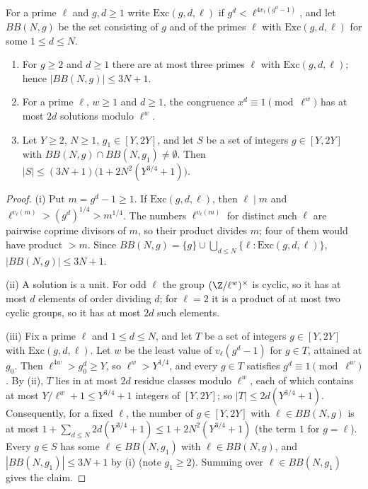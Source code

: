 \begin{lemma}\label{pf:top-supply:choicecount}
For a prime $\ell$ and $g,d\ge1$ write $\mathrm{Exc}(g,d,\ell)$ if $g^d<\ell^{4v_\ell(g^d-1)}$, and let $BB(N,g)$ be the set
consisting of $g$ and of the primes $\ell$ with $\mathrm{Exc}(g,d,\ell)$ for some $1\le d\le N$.
\begin{enumerate}[label=(\roman*)]
\item For $g\ge2$ and $d\ge1$ there are at most three primes $\ell$ with $\mathrm{Exc}(g,d,\ell)$; hence $|BB(N,g)|\le3N+1$.
\item For a prime $\ell$, $w\ge1$ and $d\ge1$, the congruence $x^d\equiv1\pmod{\ell^w}$ has at most $2d$ solutions modulo
$\ell^w$.
\item Let $Y\ge2$, $N\ge1$, $g_1\in[Y,2Y]$, and let $S$ be a set of integers $g\in[Y,2Y]$ with
$BB(N,g)\cap BB(N,g_1)\ne\emptyset$. Then $|S|\le(3N+1)\big(1+2N^2(Y^{3/4}+1)\big)$.
\end{enumerate}
 
 
 
 
\end{lemma}

\begin{proof}
(i) Put $m=g^d-1\ge1$. If $\mathrm{Exc}(g,d,\ell)$, then $\ell\mid m$ and $\ell^{v_\ell(m)}>(g^d)^{1/4}>m^{1/4}$. The numbers
$\ell^{v_\ell(m)}$ for distinct such $\ell$ are pairwise coprime divisors of $m$, so their product divides $m$; four of them
would have product $>m$. Since $BB(N,g)=\{g\}\cup\bigcup_{d\le N}\{\ell:\mathrm{Exc}(g,d,\ell)\}$, $|BB(N,g)|\le3N+1$.

(ii) A solution is a unit. For odd $\ell$ the group $(\Z/\ell^w)^\times$ is cyclic, so it has at most $d$ elements of order
dividing $d$; for $\ell=2$ it is a product of at most two cyclic groups, so it has at most $2d$ such elements.

(iii) Fix a prime $\ell$ and $1\le d\le N$, and let $T$ be a set of integers $g\in[Y,2Y]$ with $\mathrm{Exc}(g,d,\ell)$. Let $w$ be
the least value of $v_\ell(g^d-1)$ for $g\in T$, attained at $g_0$. Then $\ell^{4w}>g_0^d\ge Y$, so $\ell^w>Y^{1/4}$, and every
$g\in T$ satisfies $g^d\equiv1\pmod{\ell^w}$. By (ii), $T$ lies in at most $2d$ residue classes modulo $\ell^w$, each of which
contains at most $Y/\ell^w+1\le Y^{3/4}+1$ integers of $[Y,2Y]$; so $|T|\le2d(Y^{3/4}+1)$. Consequently, for a fixed $\ell$, the
number of $g\in[Y,2Y]$ with $\ell\in BB(N,g)$ is at most $1+\sum_{d\le N}2d(Y^{3/4}+1)\le1+2N^2(Y^{3/4}+1)$ (the term $1$ for
$g=\ell$). Every $g\in S$ has some $\ell\in BB(N,g_1)$ with $\ell\in BB(N,g)$, and $|BB(N,g_1)|\le3N+1$ by (i) (note
$g_1\ge2$). Summing over $\ell\in BB(N,g_1)$ gives the claim.
\end{proof}

